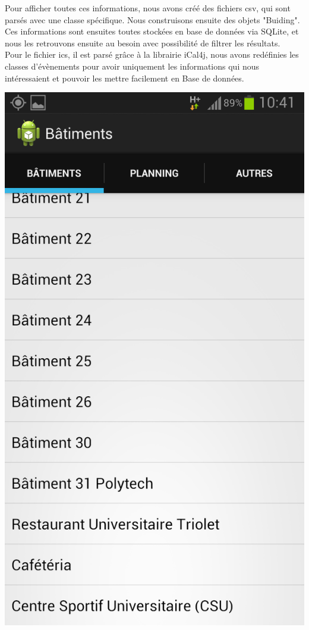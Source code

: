 \documentclass{article}
\begin{document}
	Pour afficher toutes ces informations, nous avons créé des fichiers csv, qui sont parsés avec une classe spécifique. Nous construisons ensuite des objets "Buiding". \\
	Ces informations sont ensuites toutes stockées en base de données via SQLite, et nous les retrouvons ensuite au besoin avec possibilité de filtrer les résultats. \\
	Pour le fichier ics, il est parsé grâce à la librairie iCal4j, nous avons redéfinies les classes d'évènements pour avoir uniquement les informations qui nous intéressaient et pouvoir les mettre facilement en Base de données. \\
	\begin{center}
		\includegraphics[scale=0.25]{liste.png}
	\end{center}
	
\end{document}
